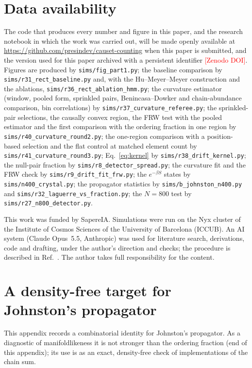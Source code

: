 \documentclass[prd,twocolumn,superscriptaddress,nofootinbib,amsmath,amssymb,floatfix]{revtex4-2}
\newcommand{\pending}[1]{\textcolor{red}{[#1]}}
\begin{document}
\section*{Data availability}
The code that produces every number and figure in this paper, and the research notebook in which the work was carried out, will be made openly available at \url{https://github.com/presindev/causet-counting} when this paper is submitted, and the version used for this paper archived with a persistent identifier \pending{Zenodo DOI}. Figures are produced by \texttt{sims/fig\_part1.py}; the baseline comparison by \texttt{sims/r31\_rect\_baseline.py} and, with the Hu--Meyer--Meyer construction and the ablations, \texttt{sims/r36\_rect\_ablation\_hmm.py}; the curvature estimator (window, pooled form, sprinkled pairs, Benincasa--Dowker and chain-abundance comparison, bin correlations) by \texttt{sims/r37\_curvature\_referee.py}; the sprinkled-pair selections, the causally convex region, the FRW test with the pooled estimator and the first comparison with the ordering fraction in one region by \texttt{sims/r40\_curvature\_round2.py}; the one-region comparison with a position-based selection and the flat control at matched element count by \texttt{sims/r41\_curvature\_round3.py}; Eq.~\eqref{eq:kernel} by \texttt{sims/r38\_drift\_kernel.py}; the null-pair fraction by \texttt{sims/r8\_detector\_spread.py}; the curvature fit and the FRW check by \texttt{sims/r9\_drift\_fit\_frw.py}; the $e^{-\beta S}$ states by \texttt{sims/n400\_crystal.py}; the propagator statistics by \texttt{sims/b\_johnston\_n400.py} and \texttt{sims/r32\_laguerre\_vs\_fraction.py}; the $N=800$ test by \texttt{sims/r27\_n800\_detector.py}.

\begin{acknowledgments}
This work was funded by SapereIA. Simulations were run on the Nyx cluster of the Institute of Cosmos Sciences of the University of Barcelona (ICCUB). An AI system (Claude Opus~5.5, Anthropic) was used for literature search, derivations, code and drafting, under the author's direction and checks; the procedure is described in Ref.~\cite{MethodNote}. The author takes full responsibility for the content.
\end{acknowledgments}

\appendix
\section{A density-free target for Johnston's propagator}\label{app:prop}
This appendix records a combinatorial identity for Johnston's propagator. As a diagnostic of manifoldlikeness it is not stronger than the ordering fraction (end of this appendix); its use is as an exact, density-free check of implementations of the chain sum.
\end{document}
